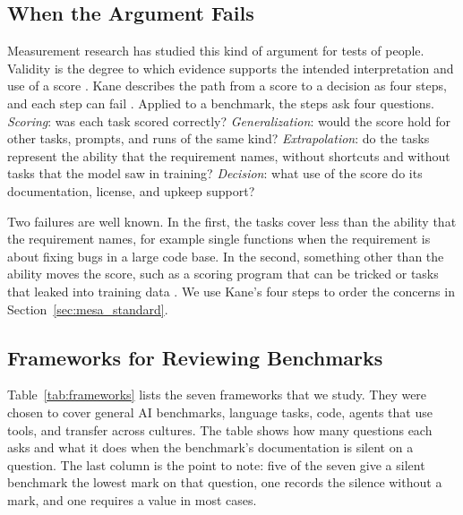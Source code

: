 \documentclass[runningheads]{llncs}
\begin{document}
\subsection{When the Argument Fails}
Measurement research has studied this kind of argument for tests of people. Validity is the degree to which evidence supports the intended interpretation and use of a score \cite{kane_validation,aera_apa_ncme_standards_2014}. Kane describes the path from a score to a decision as four steps, and each step can fail \cite{kane_validation}. Applied to a benchmark, the steps ask four questions. \emph{Scoring}: was each task scored correctly? \emph{Generalization}: would the score hold for other tasks, prompts, and runs of the same kind? \emph{Extrapolation}: do the tasks represent the ability that the requirement names, without shortcuts and without tasks that the model saw in training? \emph{Decision}: what use of the score do its documentation, license, and upkeep support?

Two failures are well known. In the first, the tasks cover less than the ability that the requirement names, for example single functions when the requirement is about fixing bugs in a large code base. In the second, something other than the ability moves the score, such as a scoring program that can be tricked or tasks that leaked into training data \cite{bean_measuring_what_matters}. We use Kane's four steps to order the concerns in Section~\ref{sec:mesa_standard}.

\subsection{Frameworks for Reviewing Benchmarks}
Table~\ref{tab:frameworks} lists the seven frameworks that we study. They were chosen to cover general AI benchmarks, language tasks, code, agents that use tools, and transfer across cultures. The table shows how many questions each asks and what it does when the benchmark's documentation is silent on a question. The last column is the point to note: five of the seven give a silent benchmark the lowest mark on that question, one records the silence without a mark, and one requires a value in most cases.
\end{document}
